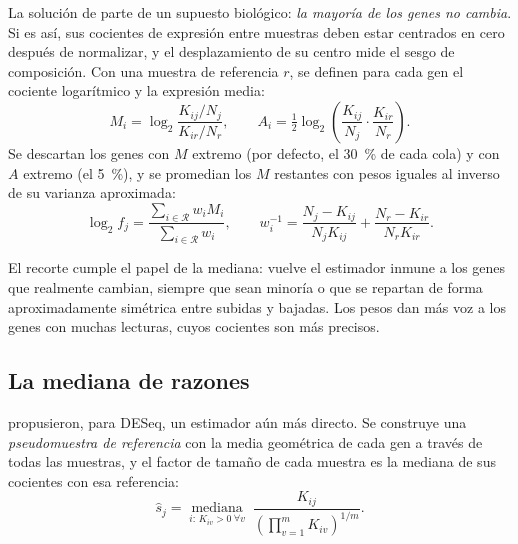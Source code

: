 La solución de \textcite{c11-robinson2010tmm} parte de un supuesto biológico: \emph{la mayoría de los genes no cambia}. Si es así, sus cocientes de expresión entre muestras deben estar centrados en cero después de normalizar, y el desplazamiento de su centro mide el sesgo de composición. Con una muestra de referencia $r$, se definen para cada gen el cociente logarítmico y la expresión media:
\begin{equation}\label{eq:11-ma}
M_i=\log_2\frac{K_{ij}/N_j}{K_{ir}/N_r},\qquad
A_i=\tfrac12\log_2\!\left(\frac{K_{ij}}{N_j}\cdot\frac{K_{ir}}{N_r}\right).
\end{equation}
Se descartan los genes con $M$ extremo (por defecto, el \SI{30}{\percent} de cada cola) y con $A$ extremo (el \SI{5}{\percent}), y se promedian los $M$ restantes con pesos iguales al inverso de su varianza aproximada:
\begin{equation}\label{eq:11-tmm}
\log_2 f_j=\frac{\sum_{i\in\mathcal R} w_i M_i}{\sum_{i\in\mathcal R} w_i},\qquad
w_i^{-1}=\frac{N_j-K_{ij}}{N_jK_{ij}}+\frac{N_r-K_{ir}}{N_rK_{ir}}.
\end{equation}

\begin{simbolos}
\end{simbolos}

El recorte cumple el papel de la mediana: vuelve el estimador inmune a los genes que realmente cambian, siempre que sean minoría o que se repartan de forma aproximadamente simétrica entre subidas y bajadas. Los pesos dan más voz a los genes con muchas lecturas, cuyos cocientes son más precisos.

\subsection{La mediana de razones}

\textcite{c11-anders2010} propusieron, para DESeq, un estimador aún más directo. Se construye una \emph{pseudomuestra de referencia} con la media geométrica de cada gen a través de todas las muestras, y el factor de tamaño de cada muestra es la mediana de sus cocientes con esa referencia:
\begin{equation}\label{eq:11-mor}
\hat s_j=\operatorname*{mediana}_{i:\,K_{iv}>0\ \forall v}\;\frac{K_{ij}}{\left(\prod_{v=1}^{m}K_{iv}\right)^{1/m}}.
\end{equation}

